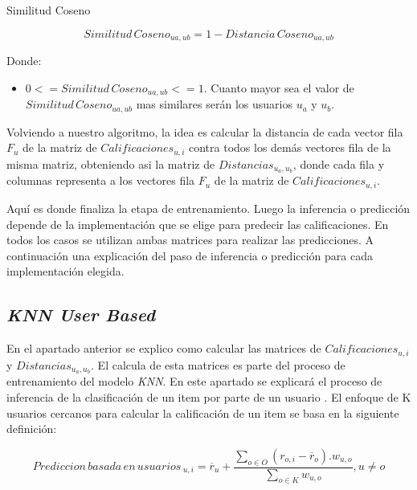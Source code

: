 \documentclass[11pt,a4paper,twoside]{thesis}
\begin{document}
\clearpage
\begin{description}
	\item[Similitud Coseno]
\end{description}
\begin{equation}
	Similitud \mspace{3mu}Coseno_{ua, ub} = 1- Distancia \mspace{3mu}Coseno_{ua, ub}
\end{equation}
\begin{description}
	\item[Donde:]
\end{description}
\begin{itemize}
	\item $0 <= Similitud \mspace{3mu}Coseno_{ua, ub} <= 1$. Cuanto mayor sea el valor de $Similitud \mspace{3mu}Coseno_{ua, ub}$ mas similares serán los usuarios $u_a$ y $u_b$.
\end{itemize}

Volviendo a nuestro algoritmo, la idea es calcular la distancia de cada vector
fila $F_u$ de la matriz de $Calificaciones_{u,i}$ contra todos los demás
vectores fila de la misma matriz, obteniendo asi la matriz de
$Distancias_{u_a,u_b}$, donde cada fila y columnas representa a los vectores
fila $F_u$ de la matriz de $Calificaciones_{u,i}$.

Aquí es donde finaliza la etapa de entrenamiento. Luego la inferencia o
predicción depende de la implementación que se elige para predecir las
calificaciones. En todos los casos se utilizan ambas matrices para realizar las
predicciones. A continuación una explicación del paso de inferencia o
predicción para cada implementación elegida.

\clearpage

\subsection{\textit{KNN User Based}}

En el apartado anterior se explico como calcular las matrices de
$Calificaciones_{u,i}$ y $Distancias_{u_a,u_b}$. El calcula de esta matrices es
parte del proceso de entrenamiento del modelo \textit{KNN}. En este apartado se
explicará el proceso de inferencia de la clasificación de un item por parte de
un usuario \cite{useritembasedinference}. El enfoque de K usuarios cercanos
para calcular la calificación de un item se basa en la siguiente definición:

\begin{equation}
	Prediccion \mspace{3mu}basada \mspace{3mu}en \mspace{3mu}usuarios\mspace{3mu}_{u, i} = \overline{r}_{u} + \frac{\sum_{o \in O} (r_{o, i} - \overline{r}_o) . w_{u, o} }{ \sum_{o \in K} w_{u, o}}, u \neq o
\end{equation}
\end{document}
